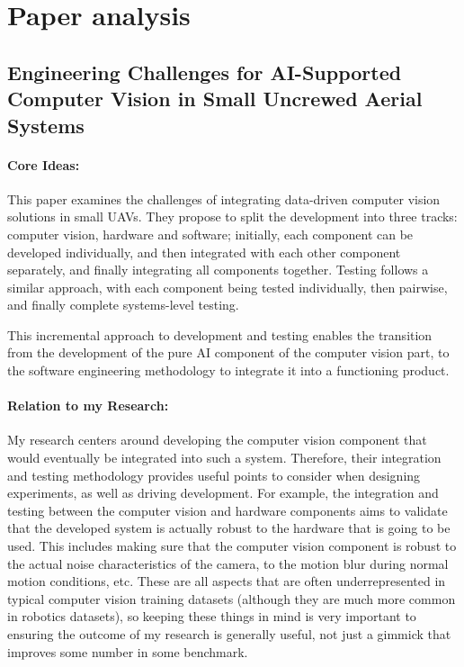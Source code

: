 \documentclass[11pt]{article}
\begin{document}
\section{Paper analysis}

\subsection{Engineering Challenges for AI-Supported Computer
Vision in Small Uncrewed Aerial Systems \cite{chowdhury2023engineering}}

\paragraph{Core Ideas:}
This paper examines the challenges of integrating data-driven computer vision solutions in small UAVs. 
They propose to split the development into three tracks: computer vision, hardware and software; initially, each component can be developed individually, and then integrated with each other component separately, and finally integrating all components together.
Testing follows a similar approach, with each component being tested individually, then pairwise, and finally complete systems-level testing.

This incremental approach to development and testing enables the transition from the development of the pure AI component of the computer vision part, to the software engineering methodology to integrate it into a functioning product.

\paragraph{Relation to my Research:}
My research centers around developing the computer vision component that would eventually be integrated into such a system.
Therefore, their integration and testing methodology provides useful points to consider when designing experiments, as well as driving development.
For example, the integration and testing between the computer vision and hardware components aims to validate that the developed system is actually robust to the hardware that is going to be used.
This includes making sure that the computer vision component is robust to the actual noise characteristics of the camera, to the motion blur during normal motion conditions, etc.
These are all aspects that are often underrepresented in typical computer vision training datasets (although they are much more common in robotics datasets), so keeping these things in mind is very important to ensuring the outcome of my research is generally useful, not just a gimmick that improves some number in some benchmark.
\end{document}
